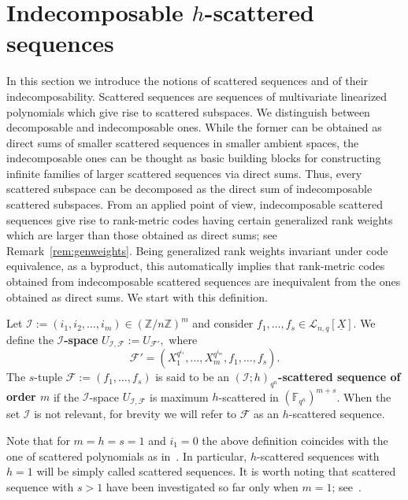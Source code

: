 \section{Indecomposable \texorpdfstring{$h$}{h}-scattered sequences}\label{sec:scattered_sequences}
{In this section we introduce the notions of scattered sequences and of their indecomposability. Scattered sequences are sequences of multivariate linearized polynomials which give rise to scattered subspaces. We distinguish between decomposable and indecomposable ones. While the former can be obtained as direct sums of smaller scattered sequences in smaller ambient spaces, the indecomposable ones can be thought as basic building blocks for constructing infinite families of larger scattered sequences via direct sums. Thus, every scattered subspace can be decomposed as the direct sum of indecomposable scattered subspaces. From an applied point of view, indecomposable scattered sequences give rise to rank-metric codes having certain generalized rank weights which are larger than those obtained as direct sums; see Remark~\ref{rem:genweights}. Being generalized rank weights invariant under code equivalence, as a byproduct, this automatically implies that rank-metric codes obtained from indecomposable scattered sequences are inequivalent from the ones obtained as direct sums.}
We start with this definition.
\begin{defi}\label{Def:ScatteredSequence}
Let $\mathcal I:=(i_1, i_2,\ldots, i_m) \in (\mathbb{Z}/n\mathbb{Z})^m$ and consider $f_1,\ldots,f_s\in \mathcal{L}_{n,q}[\underline{X}]$. We define the \textbf{$\mathcal I$-space}
$U_{\mathcal I,\mathcal{F}}:=U_{\mathcal{F}'},$
where
$$\mathcal F'=(X_1^{q^{i_1}},\ldots, X_m^{q^{i_m}}, f_1,\ldots, f_s).$$
The $s$-tuple $\mathcal{F}:=(f_1,\ldots,f_s)$ is said to be an \textbf{$(\mathcal I;h)_{q^n}$-scattered sequence of order $m$} if the $\mathcal I$-space
$U_{\mathcal I,\mathcal{F}}$
is maximum $h$-scattered in $(\mathbb{F}_{q^n})^{m+s}$. When the set $\mathcal I$ is not relevant, for brevity we will refer to $\mathcal F$ as an $h$-scattered sequence.
\end{defi}

Note that for $m=h=s=1$ and $i_1=0$ the above definition coincides with the one of scattered polynomials as in~\cite{sheekey2016new}. In particular, $h$-scattered sequences with $h=1$ will be simply called scattered sequences. It is worth noting that scattered sequence with $s>1$  have been investigated so far only when $m=1$; see~\cite{BARTOLI2020105281,bartoli2021linear}.


